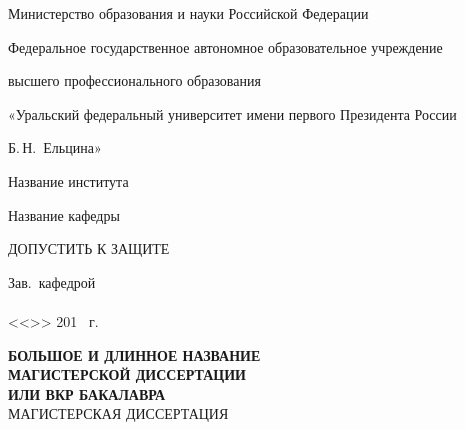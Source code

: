 \newpage
\thispagestyle{empty}

\begin{centering}

{\addtolength{\parskip}{-.35em}
Министерство образования и науки Российской Федерации

Федеральное государственное автономное образовательное учреждение

высшего профессионального образования

«Уральский федеральный университет имени первого Президента России

Б.\,Н.~Ельцина»}

\vspace{.35em} Название института

\vspace{.35em} Название кафедры

\vspace{1.5em}

\begin{flushright}
\begin{minipage}{80mm}
  \begin{flushleft}
  \large{ДОПУСТИТЬ К ЗАЩИТЕ}\vspace{-.5em}
  \end{flushleft}
  Зав.\ кафедрой \hrulefill
  \vspace{.5em} \\
  \vspace{-.25em} \\
  <<\underline{\hspace{15mm}}>> \underline{\hspace{40mm}} 201%
  \underline{\hspace{5mm}}~г. \\
\end{minipage}
\end{flushright}

\vspace{.5em}

{
  \large
  \textbf{БОЛЬШОЕ И ДЛИННОЕ НАЗВАНИЕ} \\
  \textbf{МАГИСТЕРСКОЙ ДИССЕРТАЦИИ} \\
  \textbf{ИЛИ ВКР БАКАЛАВРА} \\
  \vspace{1.5em}
  МАГИСТЕРСКАЯ ДИССЕРТАЦИЯ
  \vspace{1em} \\
}


\end{centering}
